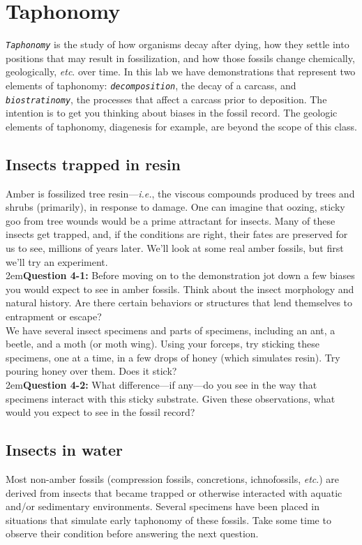 \documentclass[letterpaper, 11pt]{article}
\newcommand{\latinword}[1]{\texttt{\itshape #1}}%
\begin{document}
\section{Taphonomy}
\latinword{Taphonomy} is the study of how organisms decay after dying, how they settle into positions that may result in fossilization, and how those fossils change chemically, geologically, \textit{etc}. over time. In this lab we have demonstrations that represent two elements of taphonomy: \latinword{decomposition}, the decay of a carcass, and \latinword{biostratinomy}, the processes that affect a carcass prior to deposition. The intention is to get you thinking about biases in the fossil record. The geologic elements of taphonomy, diagenesis for example, are beyond the scope of this class.

\subsection{Insects trapped in resin}
Amber is fossilized tree resin---\textit{i.e.}, the viscous compounds produced by trees and shrubs (primarily), in response to damage. One can imagine that oozing, sticky goo from tree wounds would be a prime attractant for insects. Many of these insects get trapped, and, if the conditions are right, their fates are preserved for us to see, millions of years later. We'll look at some real amber fossils, but first we'll try an experiment.\\

\hangindent2em\textbf{Question 4-1:} Before moving on to the demonstration jot down a few biases you would expect to see in amber fossils. Think about the insect morphology and natural history. Are there certain behaviors or structures that lend themselves to entrapment or escape? \\

\noindent{}We have several insect specimens and parts of specimens, including an ant, a beetle, and a moth (or moth wing). Using your forceps, try sticking these specimens, one at a time, in a few drops of honey (which simulates resin). Try pouring honey over them. Does it stick?\\

\hangindent2em\textbf{Question 4-2:} What difference---if any---do you see in the way that specimens interact with this sticky substrate. Given these observations, what would you expect to see in the fossil record?

\subsection{Insects in water}
Most non-amber fossils (compression fossils, concretions, ichnofossils, \textit{etc}.) are derived from insects that became trapped or otherwise interacted with aquatic and/or sedimentary environments. Several specimens have been placed in situations that simulate early taphonomy of these fossils. Take some time to observe their condition before answering the next question.\\
\end{document}
